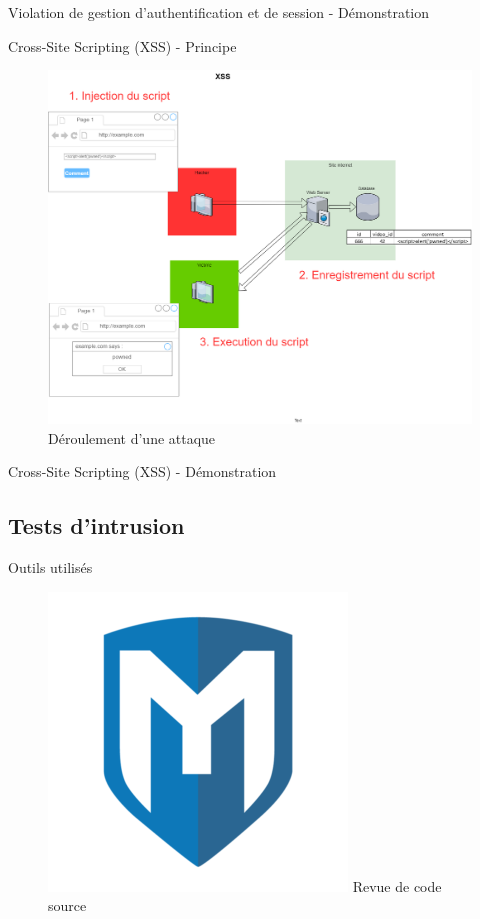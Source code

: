 \documentclass{beamer}
\begin{document}
			\begin{frame}{Violation de gestion d'authentification et de session - Démonstration}
			
			\end{frame}
		
			\begin{frame}{Cross-Site Scripting (XSS) - Principe}
			\begin{figure}
					\centering
					\includegraphics[width=0.9\linewidth]{schemas/images/XSS.png}
					\caption{Déroulement d'une attaque}
				\end{figure}
			\end{frame}
			
			\begin{frame}{Cross-Site Scripting (XSS) - Démonstration}
			
			\end{frame}
		
	\subsection{Tests d'intrusion} 
		\begin{frame}{Outils utilisés}
		\begin{figure}
			\centering
			\begin{minipage}{.5\textwidth}
				\centering
				\includegraphics[width=.4\linewidth]{schemas/images/metasploit.png}
				\break
				Revue de code source
			\end{minipage}%
			
		\end{figure}	
		\end{frame}		
		
	
\end{document}
